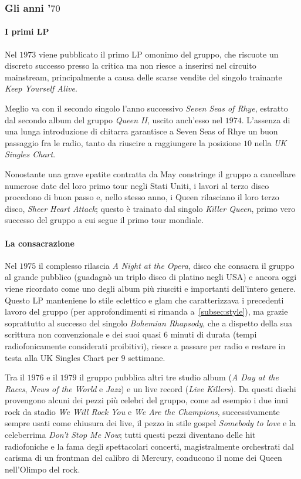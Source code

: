 \documentclass[12pt]{article}
\begin{document}
\subsubsection{Gli anni '\(70\)}
\paragraph{I primi LP}
Nel \(1973\) viene pubblicato il primo LP omonimo del gruppo, che riscuote un discreto successo presso la critica ma non riesce a inserirsi nel circuito mainstream, principalmente a causa delle scarse vendite del singolo trainante \emph{Keep Yourself Alive}.

Meglio va con il secondo singolo l'anno successivo \emph{Seven Seas of Rhye}, estratto dal secondo album del gruppo \emph{Queen II}, uscito anch'esso nel \(1974\). L'assenza di una lunga introduzione di chitarra garantisce a Seven Seas of Rhye un buon passaggio fra le radio, tanto da riuscire a raggiungere la posizione \(10\) nella	\emph{UK Singles Chart}.

Nonostante una grave epatite contratta da May constringe il gruppo a cancellare numerose date del loro primo tour negli Stati Uniti, i lavori al terzo disco procedono di buon passo e, nello stesso anno, i Queen rilasciano il loro terzo disco, \emph{Sheer Heart Attack}; questo è trainato dal singolo \emph{Killer Queen}, primo vero successo del gruppo a cui segue il primo tour mondiale.

\paragraph{La consacrazione}
Nel \(1975\) il complesso rilascia \emph{A Night at the Opera}, disco che consacra il gruppo al grande pubblico (guadagnò un triplo disco di platino negli USA) e ancora oggi viene ricordato come uno degli album più riusciti e importanti dell'intero genere. Questo LP manteniene lo stile eclettico e glam che caratterizzava i precedenti lavoro del gruppo (per approfondimenti si rimanda a~\ref{subsec:style}), ma grazie soprattutto al successo del singolo \emph{Bohemian Rhapsody}, che a dispetto della sua scrittura non convenzionale e dei suoi quasi \(6\) minuti di durata (tempi radiofonicamente considerati proibitivi), riesce a passare per radio e restare in testa alla UK Singles Chart per \(9\) settimane.

Tra il \(1976\) e il \(1979\) il gruppo pubblica altri tre studio album (\emph{A Day at the Races}, \emph{News of the World} e \emph{Jazz}) e un live record (\emph{Live Killers}). Da questi dischi provengono alcuni dei pezzi più celebri del gruppo, come ad esempio i due inni rock da stadio \emph{We Will Rock You} e \emph{We Are the Champions}, successivamente sempre usati come chiusura dei live, il pezzo in stile gospel \emph{Somebody to love} e la celeberrima \emph{Don't Stop Me Now}; tutti questi pezzi diventano delle hit radiofoniche e la fama degli spettacolari concerti, magistralmente orchestrati dal carisma di un frontman del calibro di Mercury, conducono il nome dei Queen nell'Olimpo del rock.
\end{document}
